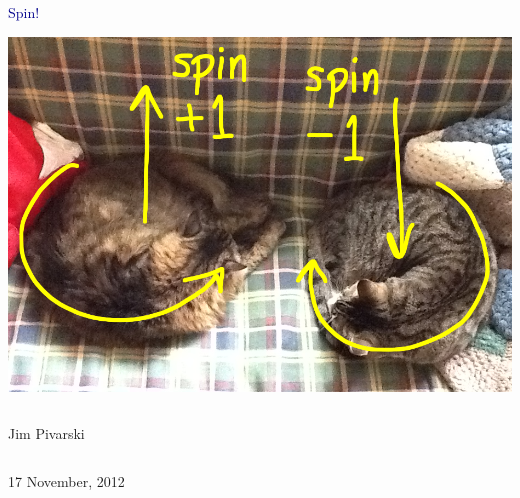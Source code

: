 \documentclass[compress]{beamer}
\begin{document}
\begin{frame}
\vfill
\begin{center}
\textcolor{darkblue}{\Huge Spin!}

\vfill
\includegraphics[width=0.5\linewidth]{spin-0.png}

\vfill
\begin{columns}
\begin{center}
\large
Jim Pivarski
\end{center}
\end{columns}


\vfill
17 November, 2012

\end{center}
\end{frame}


\small
\end{document}
